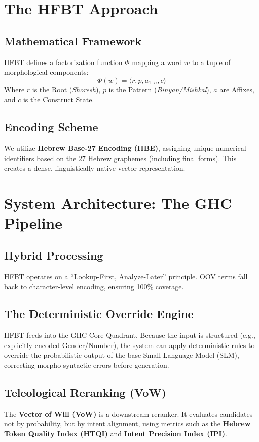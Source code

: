\documentclass[11pt,a4paper]{article}
\begin{document}
\section{The HFBT Approach}

\subsection{Mathematical Framework}
HFBT defines a factorization function $\Phi$ mapping a word $w$ to a tuple of morphological components:
\begin{equation}
\Phi(w) = \langle r, p, a_{1..n}, c \rangle
\end{equation}
Where $r$ is the Root (\textit{Shoresh}), $p$ is the Pattern (\textit{Binyan/Mishkal}), $a$ are Affixes, and $c$ is the Construct State.

\subsection{Encoding Scheme}
We utilize \textbf{Hebrew Base-27 Encoding (HBE)}, assigning unique numerical identifiers based on the 27 Hebrew graphemes (including final forms). This creates a dense, linguistically-native vector representation.

\section{System Architecture: The GHC Pipeline}

\subsection{Hybrid Processing}
HFBT operates on a ``Lookup-First, Analyze-Later'' principle. OOV terms fall back to character-level encoding, ensuring 100\% coverage.

\subsection{The Deterministic Override Engine}
HFBT feeds into the GHC Core Quadrant. Because the input is structured (e.g., explicitly encoded Gender/Number), the system can apply deterministic rules to override the probabilistic output of the base Small Language Model (SLM), correcting morpho-syntactic errors before generation.

\subsection{Teleological Reranking (VoW)}
The \textbf{Vector of Will (VoW)} is a downstream reranker. It evaluates candidates not by probability, but by intent alignment, using metrics such as the \textbf{Hebrew Token Quality Index (HTQI)} and \textbf{Intent Precision Index (IPI)}.
\end{document}
